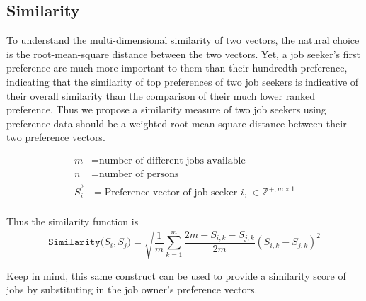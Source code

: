 \subsection{Similarity}

To understand the multi-dimensional similarity of two vectors, the natural choice is the root-mean-square distance between the two vectors. Yet, a job seeker's first preference are much more important to them than their hundredth preference, indicating that the similarity of top preferences of two job seekers is indicative of their overall similarity than the comparison of their much lower ranked preference. Thus we propose a similarity measure of two job seekers using preference data should be a weighted root mean square distance between their two preference vectors.

\begin{align}
m &= \text{number of different jobs available}\\
n &= \text{number of persons}\\
\vec{S_i} &= \text{Preference vector of job seeker $i$, } \in \mathbb{Z}^{+, m \times 1} \\
\end{align}

Thus the similarity function is
\[\texttt{Similarity}({S_i, S_j)} = \sqrt{\frac{1}{m} \sum_{k=1}^{m} \frac{2m - S_{i,k} - S_{j,k}}{2m}(S_{i,k} - S_{j,k})^2}\]

Keep in mind, this same construct can be used to provide a similarity score of jobs by substituting in the job owner's preference vectors.

